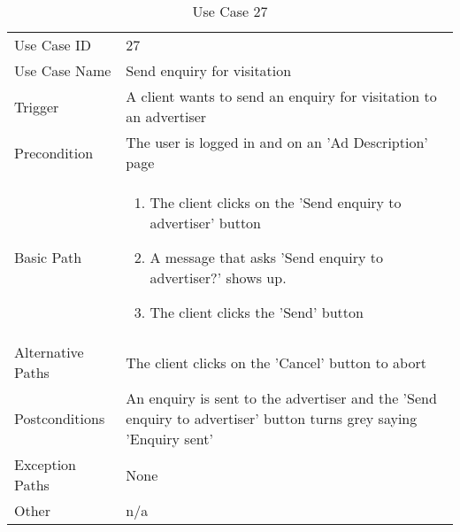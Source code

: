 \begin{table}[H]
\centering
\label{table-use-case-27}
\begin{tabular}{|p{3cm}|p{10cm}}
Use Case ID       & 27                                                           
\\
Use Case Name     & Send enquiry for visitation                                                         
\\
Trigger           & A client wants to send an enquiry for visitation to an advertiser
\\
Precondition      & The user is logged in and on an 'Ad Description' page                                                
\\
Basic Path        & \begin{enumerate}
\item The client clicks on the 'Send enquiry to advertiser' button
\item A message that asks 'Send enquiry to advertiser?' shows up.
\item The client clicks the 'Send' button
\end{enumerate} 
     \\
Alternative Paths & The client clicks on the 'Cancel' button to abort                      
\\
Postconditions    & An enquiry is sent to the advertiser and the 'Send enquiry
to advertiser' button turns grey saying 'Enquiry sent'
\\
Exception Paths   & None                          \\
Other             & n/a                                                                                                                                                                                                        
\end{tabular}
\caption{Use Case 27}
\end{table}

